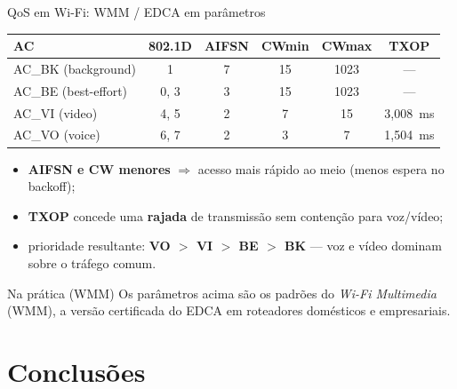 \documentclass[aspectratio=169,11pt]{beamer}
\begin{document}
\begin{frame}{QoS em Wi-Fi: WMM / EDCA em parâmetros}
  \begin{center}
    \scriptsize
    \begin{tabular}{@{}lccccc@{}}
      \toprule
      \textbf{AC} & \textbf{802.1D} & \textbf{AIFSN} & \textbf{CWmin} & \textbf{CWmax} & \textbf{TXOP}\\
      \midrule
      AC\_BK (background) & 1 & 7 & 15 & 1023 & ---\\
      AC\_BE (best-effort) & 0, 3 & 3 & 15 & 1023 & ---\\
      AC\_VI (video) & 4, 5 & 2 & 7 & 15 & 3{,}008~ms\\
      AC\_VO (voice) & 6, 7 & 2 & 3 & 7 & 1{,}504~ms\\
      \bottomrule
    \end{tabular}
  \end{center}
  \begin{itemize}
    \item \textbf{AIFSN e CW menores} $\Rightarrow$ acesso mais rápido ao meio (menos espera no backoff);
    \item \textbf{TXOP} concede uma \textbf{rajada} de transmissão sem contenção para voz/vídeo;
    \item prioridade resultante: \textbf{VO $>$ VI $>$ BE $>$ BK} --- voz e vídeo dominam sobre o tráfego comum.
  \end{itemize}
  \begin{exampleblock}{Na prática (WMM)}
    Os parâmetros acima são os padrões do \emph{Wi-Fi Multimedia} (WMM), a versão certificada do EDCA em roteadores domésticos e empresariais.
  \end{exampleblock}
\end{frame}

\section{Conclusões}
\end{document}
